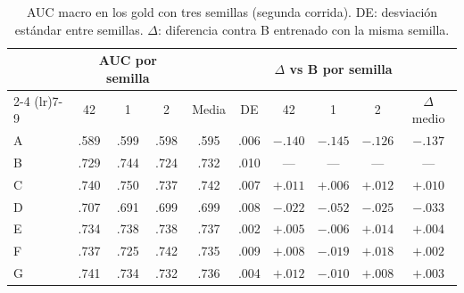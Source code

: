 \begin{table}[t]
  \caption{AUC macro en los gold con tres semillas (segunda corrida). DE: desviación estándar entre semillas.
    $\Delta$: diferencia contra B entrenado con la misma semilla.}
  \label{tab:semillas}
  \centering
  \small
  \setlength{\tabcolsep}{4pt}
  \begin{tabular}{@{}lccccccccc@{}}
    \toprule
    & \multicolumn{3}{c}{AUC por semilla} & & & \multicolumn{3}{c}{$\Delta$ vs B por semilla} & \\
    \cmidrule(lr){2-4} \cmidrule(lr){7-9}
    & 42 & 1 & 2 & Media & DE & 42 & 1 & 2 & $\Delta$ medio \\
    \midrule
    A & .589 & .599 & .598 & .595 & .006 & $-.140$ & $-.145$ & $-.126$ & $-.137$ \\
    B & .729 & .744 & .724 & .732 & .010 & ---     & ---     & ---     & ---     \\
    C & .740 & .750 & .737 & .742 & .007 & $+.011$ & $+.006$ & $+.012$ & $+.010$ \\
    D & .707 & .691 & .699 & .699 & .008 & $-.022$ & $-.052$ & $-.025$ & $-.033$ \\
    E & .734 & .738 & .738 & .737 & .002 & $+.005$ & $-.006$ & $+.014$ & $+.004$ \\
    F & .737 & .725 & .742 & .735 & .009 & $+.008$ & $-.019$ & $+.018$ & $+.002$ \\
    G & .741 & .734 & .732 & .736 & .004 & $+.012$ & $-.010$ & $+.008$ & $+.003$ \\
    \bottomrule
  \end{tabular}
\end{table}

